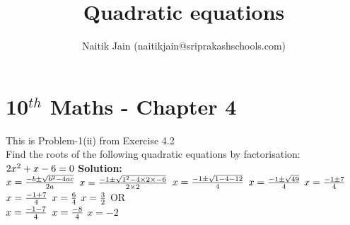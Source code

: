 \documentclass[12pt]{article}
\title{Quadratic equations}
\author{Naitik Jain (naitikjain@sriprakashschools.com)}
\newcommand{\solution}{\noindent \textbf{Solution: }}
\begin{document}
\section*{10$^{th}$ Maths - Chapter 4}
This is Problem-1(ii) from Exercise 4.2\\
Find the roots of the following quadratic equations by factorisation:\\
${{2}x^2+ {x} -{6} }= 0\\$
\solution\\
$x=\frac{-b\pm\sqrt{b^2-4ac}}{2a}\\$
$x=\frac{-1\pm\sqrt{1^2-4 \times 2\times -6}}{2 \times 2}\\$
$x=\frac{-1\pm\sqrt{1-{4}{-12}}}{4}\\$
$x=\frac{-1\pm\sqrt{49}}{4}\\$
$x=\frac{-1\pm{7}}{4}\\$
$x=\frac{-1+7}{4}\\$
$x=\frac{6}{4}\\$
$x=\frac{3}{2}\\$
OR\\
$x=\frac{-1-7}{4}\\$
$x=\frac{-8}{4}\\$
$x=-2$
\end{document}
